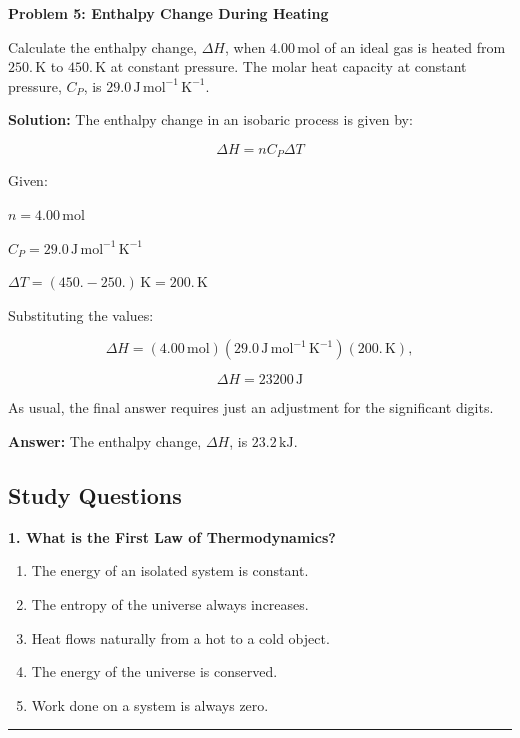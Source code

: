 \documentclass[
  9pt,
]{extbook}
\providecommand{\tightlist}{%
  \setlength{\itemsep}{0pt}\setlength{\parskip}{0pt}}
\theoremstyle{definition}
\theoremstyle{definition}
\theoremstyle{definition}
\theoremstyle{remark}
\begin{document}
\textbf{Problem 5: Enthalpy Change During Heating}

Calculate the enthalpy change, \(\Delta H\), when \(4.00 \, \text{mol}\) of an ideal gas is heated from \(250. \, \text{K}\) to \(450. \, \text{K}\) at constant pressure. The molar heat capacity at constant pressure, \(C_P\), is \(29.0 \, \text{J} \, \text{mol}^{-1} \, \text{K}^{-1}\).

\textbf{Solution:} The enthalpy change in an isobaric process is given by:

\[ \Delta H = n C_P \Delta T \]

Given:

\(n = 4.00 \, \text{mol}\)

\(C_P = 29.0 \, \text{J} \, \text{mol}^{-1} \, \text{K}^{-1}\)

\(\Delta T = (450. - 250.) \, \text{K} = 200. \, \text{K}\)

Substituting the values:

\[ \Delta H = (4.00\, \text{mol}) (29.0 \, \text{J} \, \text{mol}^{-1} \, \text{K}^{-1}) (200.\,\text{K}),\]

\[ \Delta H = 23200 \, \text{J} \]

As usual, the final answer requires just an adjustment for the significant digits.

\textbf{Answer:} The enthalpy change, \(\Delta H\), is \(23.2 \, \text{kJ}\).

\hypertarget{quest3}{%
\subsection{Study Questions}\label{quest3}}

\textbf{1. What is the First Law of Thermodynamics?}

\begin{enumerate}
\def\labelenumi{\alph{enumi}.}
\tightlist
\item
  The energy of an isolated system is constant.
\item
  The entropy of the universe always increases.
\item
  Heat flows naturally from a hot to a cold object.
\item
  The energy of the universe is conserved.
\item
  Work done on a system is always zero.
\end{enumerate}

\begin{center}\rule{0.5\linewidth}{0.5pt}\end{center}
\end{document}
